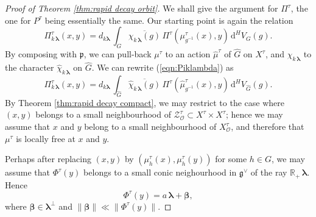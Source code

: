 \documentclass[12pt,a4paper]{article}
\theoremstyle{plain}
\theoremstyle{definition}
\begin{document}
\begin{proof}
[{Proof of Theorem \ref{thm:rapid decay orbit}}]
We shall give the argument for $\Pi^\tau$, the one 
for $P^\tau$ being essentially the same.
%
Our starting point is again the relation
\begin{equation}
\label{eqn:Piklambda}
\Pi^\tau_{k\,\boldsymbol{\lambda}}(x,y)=
d_{k\boldsymbol{\lambda}}\,
\int_G \overline{\chi_{k\,\boldsymbol{\lambda}}(g)}\,
\Pi^\tau
\left(\mu^\tau_{g^{-1}}(x),y   \right)\,
\mathrm{d}^HV_G(g).
\end{equation}
By composing with $\mathfrak{p}$, 
we can pull-back $\mu^\tau$ to an action $\hat{\mu}^\tau$ of $\hat{G}$ on $X^\tau$, and
$\chi_{k\,\boldsymbol{\lambda}}$ to the character $\hat{\chi}_{k\,\boldsymbol{\lambda}}$ on 
$\hat{G}$. We
can rewrite (\ref{eqn:Piklambda})
as
\begin{equation}
\label{eqn:Piklambdatilde}
\Pi^\tau_{k\,\boldsymbol{\lambda}}(x,y)=
d_{k\boldsymbol{\lambda}}\,
\int_{\hat{G}} \overline{\hat{\chi}_{k\,\boldsymbol{\lambda}}(g)}\,
\Pi^\tau
\left(\hat{\mu}^\tau_{g^{-1}}(x),y   \right)\,
\mathrm{d}^HV_{\hat{G}}(g).
\end{equation}
%
By Theorem \ref{thm:rapid decay compact}, we may restrict to the case where
$(x,y)$ belongs to a small neighbourhood of $\mathcal{Z}^\tau_{\mathcal{O}}
\subset X^\tau\times X^\tau$; hence we may assume that $x$ and $y$ belong to a small neighbourhood of
$X^\tau_{\mathcal{O}}$, and therefore that 
$\mu^\tau$ is locally free at $x$ and $y$.

Perhaps after replacing $(x,y)$ by $\left(\mu^\tau_h(x),\mu^\tau_h(y)\right)$
for some $h\in G$,
we may assume that $\Phi^\tau(y)$ belongs to a small conic 
neighourhood in $\mathfrak{g}^\vee$ of the ray 
$\mathbb{R}_+\,\boldsymbol{\lambda}$. Hence
\begin{equation}
\label{eqn:Phitauy}
\Phi^\tau(y)=a\,\boldsymbol{\lambda}+
\boldsymbol{\beta},
\end{equation}
%
where $\boldsymbol{\beta}\in \boldsymbol{\lambda}^\perp$ and
$\|\boldsymbol{\beta}\|\ll \|\Phi^\tau(y)\|$.



\end{proof}
\end{document}
